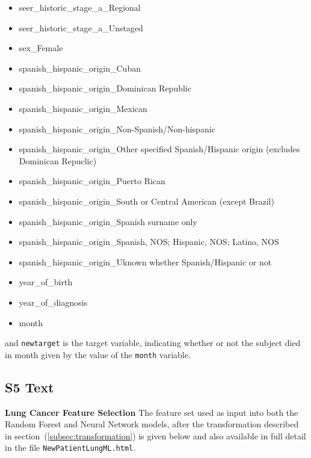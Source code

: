 \documentclass[10pt,letterpaper]{article}
\newcommand{\codewhite}[1]{\colorbox{white}{\texttt{#1}}}
\begin{document}
\begin{itemize}[noitemsep]
\item seer\_historic\_stage\_a\_Regional
\item seer\_historic\_stage\_a\_Unstaged
\item sex\_Female
\item spanish\_hispanic\_origin\_Cuban
\item spanish\_hispanic\_origin\_Dominican Republic
\item spanish\_hispanic\_origin\_Mexican
\item spanish\_hispanic\_origin\_Non-Spanish/Non-hispanic
\item spanish\_hispanic\_origin\_Other specified Spanish/Hispanic origin (excludes Dominican Repuclic)
\item spanish\_hispanic\_origin\_Puerto Rican
\item spanish\_hispanic\_origin\_South or Central American (except Brazil)
\item spanish\_hispanic\_origin\_Spanish surname only
\item spanish\_hispanic\_origin\_Spanish, NOS; Hispanic, NOS; Latino, NOS
\item spanish\_hispanic\_origin\_Uknown whether Spanish/Hispanic or not
\item year\_of\_birth
\item year\_of\_diagnosis
\item month
\end{itemize}


and 
\codewhite{newtarget} is the target variable, indicating whether or not the subject died in month given by the value of the \codewhite{month} variable.






\subsection*{S5 Text}
\label{S5_Text}

{\bf Lung Cancer Feature Selection} The feature set used as input into both the Random Forest and Neural Network models, after the transformation described in section~(\ref{subsec:transformation}) is given below and also available in full detail in the file 
\codewhite{NewPatientLungML.html}.
\end{document}
